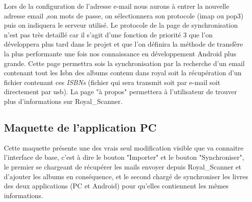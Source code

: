 Lors de la configuration de l'adresse e-mail nous aurons à entrer la nouvelle adresse email ,son mots de passe, on sélectionnera son protocole (imap ou pop3) puis on indiquera le serveur utilisé.
Le protocole de la page de synchronisation n'est pas très detaillé car il s'agit d'une fonction de priorité 3 que l'on développera plus tard dans le projet et que l'on définira la méthode de transfère la plus performante une fois nos connaissance en développement Android plus grande. 
Cette page permettra sois la synchronisation par la recherche d'un email contenant tout les Isbn des albums contenu dans royal soit la récupération d'un fichier contenant ces \emph{ISBNs} (fichier qui sera transmit soit par e-mail soit directement par usb).
La page "à propos" permettera à l'utilisateur de trouver plus d'informations sur Royal\_Scanner.

\newpage{}

\subsection{Maquette de l'application PC}

  \begin{figure}[htbp]
  \begin{center}
    \leavevmode
  \end{center}
\end{figure}

Cette maquette présente une des vrais seul modification visible que va connaitre l'interface de base, c'est à dire le bouton "Importer" et le bouton "Synchroniser", le premier se chargeant de récupérer les mails envoyer depuis Royal\_Scanner et d'ajouter les albums en conséquence, et le second chargé de synchroniser les livres des deux applications (PC et Android) pour qu'elles contiennent les mêmes informations.

